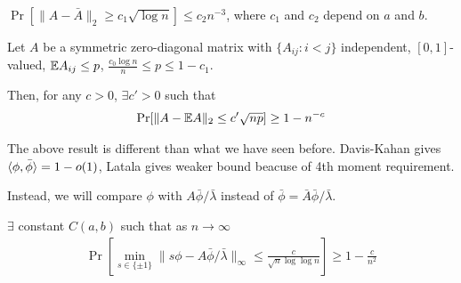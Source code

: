 \begin{lemma}
  $\Pr[\|A - \bar{A}\|_2 \geq c_1 \sqrt{\log n}] \leq c_2 n^{-3}$,
  where $c_1$ and $c_2$ depend on $a$ and $b$.
\end{lemma}

\begin{lemma}
  Let $A$ be a symmetric zero-diagonal matrix with $\{A_{ij} : i < j\}$
  independent, $[0,1]$-valued, $\mathbb{E} A_{ij} \leq p$,
  $\frac{c_0 \log n}{n} \leq p \leq 1 - c_1$.

  Then, for any $c > 0$, $\exists c' > 0$ such that
  \begin{align}
    \Pr[\|A - \mathbb{E} A\|_2 \leq c' \sqrt{np}] \geq 1 - n^{-c}
  \end{align}
\end{lemma}

\begin{remark}
  The above result is different than what we have seen before.
  Davis-Kahan gives $\braket{\phi, \bar\phi} = 1 - o(1)$,
  Latala gives weaker bound beacuse of 4th moment requirement.
\end{remark}

Instead, we will compare $\phi$ with $A \bar\phi / \bar\lambda$ instead of
$\bar\phi = \bar{A} \bar\phi / \bar\lambda$.
\begin{lemma}
  $\exists$ constant $C(a,b)$ such that as $n \to \infty$
  \begin{align}
    \Pr\left[
      \min_{s \in \{\pm 1\}} \|s \phi - A \bar\phi/\bar\lambda\|_\infty
      \leq \frac{c}{\sqrt{n} \log \log n}
    \right] \geq 1 - \frac{c}{n^2}
  \end{align}
\end{lemma}

